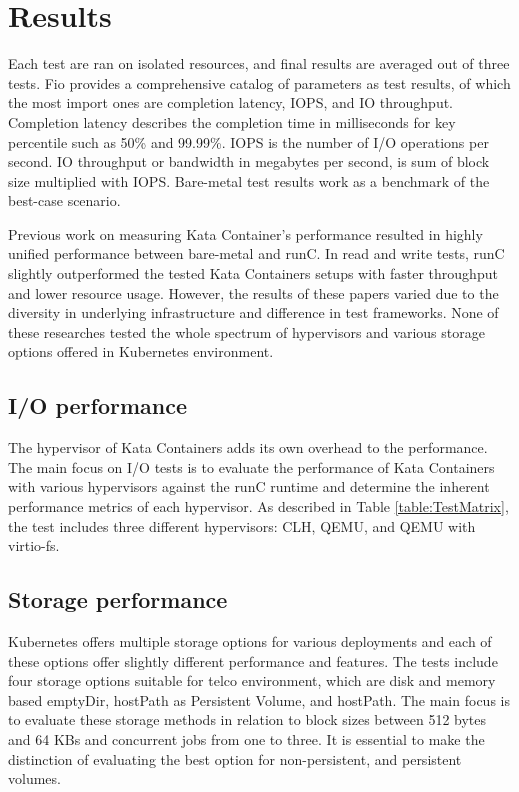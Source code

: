 \section{Results}

Each test are ran on isolated resources, and final results are averaged out of three tests. Fio provides a comprehensive catalog of parameters as test results, of which the most import ones are completion latency, IOPS, and IO throughput. Completion latency describes the completion time in milliseconds for key percentile such as 50\% and 99.99\%. IOPS is the number of I/O operations per second. IO throughput or bandwidth in megabytes per second, is sum of block size multiplied with IOPS. Bare-metal test results work as a benchmark of the best-case scenario.

Previous work \cite{EverartsdeVelp2020}\cite{Kumar2020}\cite{StackHPCKata}\cite{Randazzo2019} on measuring Kata Container's performance resulted in highly unified performance between bare-metal and runC. In read and write tests, runC slightly outperformed the tested Kata Containers setups with faster throughput and lower resource usage. However, the results of these papers varied due to the diversity in underlying infrastructure and difference in test frameworks. None of these researches tested the whole spectrum of hypervisors and various storage options offered in Kubernetes environment.

\subsection{I/O performance}

The hypervisor of Kata Containers adds its own overhead to the performance. The main focus on I/O tests is to evaluate the performance of Kata Containers with various hypervisors against the runC runtime and determine the inherent performance metrics of each hypervisor. As described in Table \ref{table:TestMatrix}, the test includes three different hypervisors: CLH, QEMU, and QEMU with virtio-fs.

\subsection{Storage performance}

Kubernetes offers multiple storage options for various deployments and each of these options offer slightly different performance and features. The tests include four storage options suitable for telco environment, which are disk and memory based emptyDir, hostPath as Persistent Volume, and hostPath. The main focus is to evaluate these storage methods in relation to block sizes between 512 bytes and 64 KBs and concurrent jobs from one to three. It is essential to make the distinction of evaluating the best option for non-persistent, and persistent volumes.


